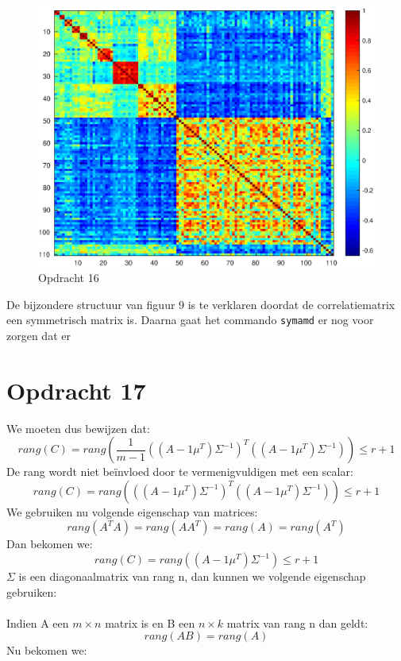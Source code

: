 \documentclass[11pt,a4paper]{article}
\begin{document}
\begin{figure}[H]
\centering
\includegraphics[scale=0.55]{opdracht16}
\caption{Opdracht 16}
\end{figure}
De bijzondere structuur van figuur 9 is te verklaren doordat de correlatiematrix een symmetrisch matrix is. Daarna gaat het commando \texttt{symamd} er nog voor zorgen dat er


\section*{Opdracht 17}

We moeten dus bewijzen dat:
$$ rang(C) = rang\left(\frac{1}{m-1}((A-1\mu^T)\Sigma^{-1})^T((A-1\mu^T)\Sigma^{-1})\right) \leq r + 1$$
De rang wordt niet beïnvloed door te vermenigvuldigen met een scalar:
$$ rang(C) = rang\left(((A-1\mu^T)\Sigma^{-1})^T((A-1\mu^T)\Sigma^{-1})\right) \leq r + 1$$
We gebruiken nu volgende eigenschap van matrices:
\begin{equation}
rang(A^TA) = rang(AA^T) = rang(A) = rang(A^T)
\end{equation}
Dan bekomen we:
$$ rang(C) = rang\left((A-1\mu^T)\Sigma^{-1}\right) \leq r + 1$$
$\Sigma$ is een diagonaalmatrix van rang n, dan kunnen we volgende eigenschap gebruiken:
\\
\\
Indien A een $m\times n$ matrix is en B een $n\times k$ matrix van rang n dan geldt:
\begin{equation}
rang(AB) = rang(A)
\end{equation}
Nu bekomen we:
\end{document}
